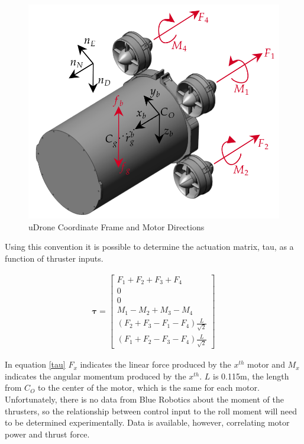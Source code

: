 \begin{figure}[h]
\includegraphics[width=\maxwidth{\textwidth}]{img/cord_frame.png}
\caption{uDrone Coordinate Frame and Motor Directions}
\label{cord_frame}
\end{figure}

Using this convention it is possible to determine the actuation matrix, tau, as a function of thruster inputs.

\begin{gather}
    \boldsymbol{\tau}=\left[\begin{array}{c}
        F_1+F_2+F_3+F_4 \\ 0 \\ 0 \\ M_1-M_2+M_3-M_4 \\ (F_2+F_3-F_1-F_4) \frac{L}{\sqrt{2}} \\ (F_1+F_2-F_3-F_4) \frac{L}{\sqrt{2}}
     \end{array}\right]
     \label{tau}
\end{gather}

In equation \ref{tau} $F_x$ indicates the linear force produced by the $x^{th}$ motor and $M_x$ indicates the angular momentum produced by the $x^{th}$. $L$ is 0.115m, the length from $C_O$ to the center of the motor, which is the same for each motor. Unfortunately, there is no data from Blue Robotics about the moment of the thrusters, so the relationship between control input to the roll moment will need to be determined experimentally. Data is available, however, correlating motor power and thrust force. 

